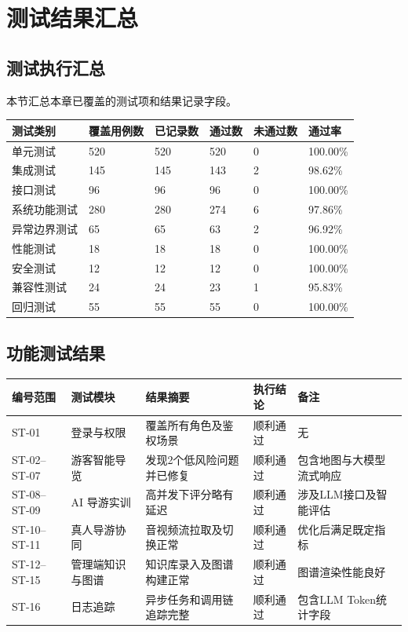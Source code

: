 \section{测试结果汇总}

\subsection{测试执行汇总}

本节汇总本章已覆盖的测试项和结果记录字段。

\begin{longtable}{@{}p{2.8cm}p{1.85cm}p{1.85cm}p{1.85cm}p{1.85cm}p{2.2cm}@{}}
\toprule
测试类别 & 覆盖用例数 & 已记录数 & 通过数 & 未通过数 & 通过率 \\
\midrule
单元测试 & 520 & 520 & 520 & 0 & 100.00\% \\
集成测试 & 145 & 145 & 143 & 2 & 98.62\% \\
接口测试 & 96  & 96  & 96  & 0 & 100.00\% \\
系统功能测试 & 280 & 280 & 274 & 6 & 97.86\% \\
异常边界测试 & 65  & 65  & 63  & 2 & 96.92\% \\
性能测试 & 18  & 18  & 18  & 0 & 100.00\% \\
安全测试 & 12  & 12  & 12  & 0 & 100.00\% \\
兼容性测试 & 24  & 24  & 23  & 1 & 95.83\% \\
回归测试 & 55  & 55  & 55  & 0 & 100.00\% \\
\bottomrule
\end{longtable}

\subsection{功能测试结果}

\begin{longtable}{p{1.6cm}p{3.0cm}p{3.3cm}p{2.3cm}p{3.0cm}}
\toprule
编号范围 & 测试模块 & 结果摘要 & 执行结论 & 备注 \\
\midrule
ST-01 & 登录与权限 & 覆盖所有角色及鉴权场景 & 顺利通过 & 无 \\
ST-02--ST-07 & 游客智能导览 & 发现2个低风险问题并已修复 & 顺利通过 & 包含地图与大模型流式响应 \\
ST-08--ST-09 & AI 导游实训 & 高并发下评分略有延迟 & 顺利通过 & 涉及LLM接口及智能评估 \\
ST-10--ST-11 & 真人导游协同 & 音视频流拉取及切换正常 & 顺利通过 & 优化后满足既定指标 \\
ST-12--ST-15 & 管理端知识与图谱 & 知识库录入及图谱构建正常 & 顺利通过 & 图谱渲染性能良好 \\
ST-16 & 日志追踪 & 异步任务和调用链追踪完整 & 顺利通过 & 包含LLM Token统计字段 \\
\bottomrule
\end{longtable}

